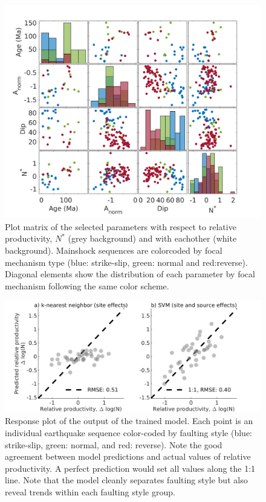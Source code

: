 \documentclass[12pt, notitlepage]{report}
\begin{document}
\begin{figure}
    \centering
    \includegraphics{figures/plotmatrix.png}
    \caption{Plot matrix of the selected parameters with respect to relative productivity, $N^*$ (grey background) and with eachother (white background). Mainshock sequences are colorcoded by focal mechanism type (blue: strike-slip, green: normal and red:reverse). Diagonal elements show the distribution of each parameter by focal mechanism following the same color scheme.}
    \label{fig:plotmatrix}
\end{figure}


\begin{figure}
    \centering
    \includegraphics{figures/response.png}
    \caption{Response plot of the output of the trained model. Each point is an individual earthquake sequence color-coded by faulting style (blue: strike-slip, green: normal, and red: reverse). Note the good agreement between model predictions and actual values of relative productivity. A perfect prediction would set all values along the 1:1 line. Note that the model cleanly separates faulting style but also reveal trends within each faulting style group.}
    \label{fig:response}
\end{figure}
\end{document}
